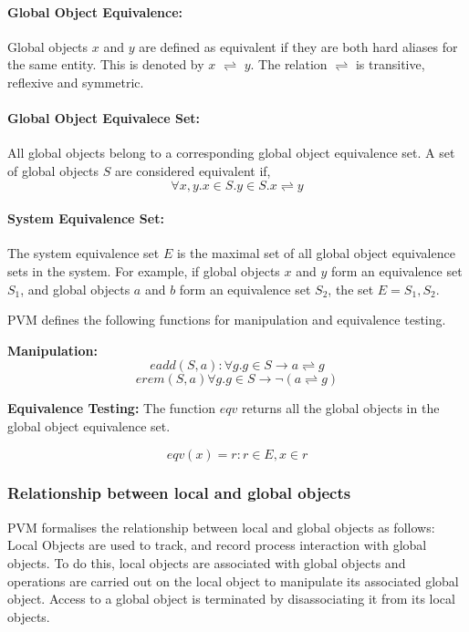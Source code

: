 \documentclass[withindex,glossary]{cam-thesis}
\begin{document}
\paragraph{Global Object Equivalence:} Global objects $x$ and $y$ are defined as equivalent if they are both hard aliases for the same entity.
This is denoted by $x$ $\rightleftharpoons$ $y$.
The relation $\rightleftharpoons$ is transitive, reflexive and symmetric.

\paragraph{Global Object Equivalece Set:}
All global objects belong to a corresponding global object equivalence set.
A set of global objects $S$ are considered equivalent if,
$$\forall x,y.x \in S.y \in S.x \rightleftharpoons y$$

\paragraph{System Equivalence Set:}
The system equivalence set $E$ is the maximal set of all global object equivalence sets in the system.
For example, if global objects $x$ and $y$ form an equivalence set $S_1$, and global objects $a$ and $b$ form an equivalence set $S_2$, the set $E = {S_1, S_2}$.

PVM defines the following functions for manipulation and equivalence testing.

\textbf{Manipulation:}
$$eadd(S, a):\forall g.g \in S \rightarrow a \rightleftharpoons g$$
$$erem(S, a) \forall g.g \in S \rightarrow  \neg(a \rightleftharpoons g)$$

\textbf{Equivalence Testing:}
The function $eqv$ returns all the global objects in the global object equivalence set.

$$eqv(x)={r:r \in E, x \in r}$$

\subsubsection{Relationship between local and global objects}
PVM formalises the relationship between local and global objects as follows:
Local Objects are used to track, and record process interaction with global objects.
To do this, local objects are associated with global objects and operations are carried out on the local object to manipulate its associated global object.
Access to a global object is terminated by disassociating it from its local objects.
\end{document}
